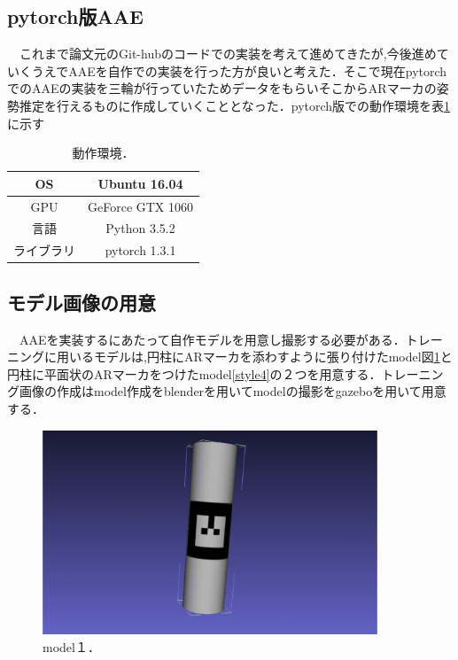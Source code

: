 \documentclass[11pt,a4j,ascmac]{jsarticle}
\begin{document}

\subsection{pytorch版AAE}
　これまで論文元のGit-hubのコードでの実装を考えて進めてきたが,今後進めていくうえでAAEを自作での実装を行った方が良いと考えた．そこで現在pytorchでのAAEの実装を三輪が行っていたためデータをもらいそこからARマーカの姿勢推定を行えるものに作成していくこととなった．pytorch版での動作環境を表\ref{operating_environment}に示す\\


\begin{table}[H]
\caption{動作環境．}
\label{operating_environment}
\begin{center}
\begin{tabular}{c|c}
\hline
OS & Ubuntu 16.04 \\ \hline 
GPU & GeForce GTX 1060 \\ \hline
言語 & Python 3.5.2 \\ \hline
ライブラリ & pytorch 1.3.1\\ \hline
\end{tabular}
\end{center}
\end{table}



\subsection{モデル画像の用意}
　AAEを実装するにあたって自作モデルを用意し撮影する必要がある．トレーニングに用いるモデルは,円柱にARマーカを添わすように張り付けたmodel図\ref{style3}と円柱に平面状のARマーカをつけたmodel\ref{style4}の２つを用意する．トレーニング画像の作成はmodel作成をblenderを用いてmodelの撮影をgazeboを用いて用意する．

      \begin{figure}[htpp]
      \centering
      \includegraphics[width=100mm]{11-3.eps}
      \vspace*{25mm}
      \caption{model１．}
      \label{style3}
      \end{figure}
\end{document}
